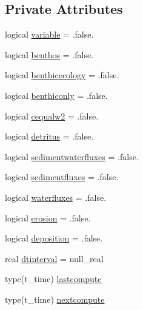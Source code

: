 \subsection*{Private Attributes}
\begin{DoxyCompactItemize}
\item 
logical \mbox{\hyperlink{structmoduleinterfacesedimentwater_1_1t__evolution_a92a72085a89182f3555e312575df6eb8}{variable}} = .false.
\item 
logical \mbox{\hyperlink{structmoduleinterfacesedimentwater_1_1t__evolution_a795a1543c6e81c4ccd8ff4cf21339e09}{benthos}} = .false.
\item 
logical \mbox{\hyperlink{structmoduleinterfacesedimentwater_1_1t__evolution_a3cb42761d8d756e75d3a64c389b97962}{benthicecology}} = .false.
\item 
logical \mbox{\hyperlink{structmoduleinterfacesedimentwater_1_1t__evolution_a32fe767c4235da35cf8fcdc903d853f3}{benthiconly}} = .false.
\item 
logical \mbox{\hyperlink{structmoduleinterfacesedimentwater_1_1t__evolution_a25d8b1b3268ecd37dff6c37370ecd535}{cequalw2}} = .false.
\item 
logical \mbox{\hyperlink{structmoduleinterfacesedimentwater_1_1t__evolution_ad1a735e37bdaa1305206dab86e7d33bd}{detritus}} = .false.
\item 
logical \mbox{\hyperlink{structmoduleinterfacesedimentwater_1_1t__evolution_a77d7520d284bcbdbbff318e4ca61a144}{sedimentwaterfluxes}} = .false.
\item 
logical \mbox{\hyperlink{structmoduleinterfacesedimentwater_1_1t__evolution_aa8485fe2c8005e16129854cdf151aed1}{sedimentfluxes}} = .false.
\item 
logical \mbox{\hyperlink{structmoduleinterfacesedimentwater_1_1t__evolution_a30c5719e7314db91a38b7bd9d04a38e8}{waterfluxes}} = .false.
\item 
logical \mbox{\hyperlink{structmoduleinterfacesedimentwater_1_1t__evolution_a3b5af3fc8362f3377495869d46216f99}{erosion}} = .false.
\item 
logical \mbox{\hyperlink{structmoduleinterfacesedimentwater_1_1t__evolution_a43d8196f5644eca1acaf926fd3736211}{deposition}} = .false.
\item 
real \mbox{\hyperlink{structmoduleinterfacesedimentwater_1_1t__evolution_a070d22f37e5d10b1acc487345786baca}{dtinterval}} = null\+\_\+real
\item 
type(t\+\_\+time) \mbox{\hyperlink{structmoduleinterfacesedimentwater_1_1t__evolution_a253c238c3788d478f686ca41dac8a4ed}{lastcompute}}
\item 
type(t\+\_\+time) \mbox{\hyperlink{structmoduleinterfacesedimentwater_1_1t__evolution_a9997bf189f49954c5ac95855c3db737d}{nextcompute}}
\end{DoxyCompactItemize}


